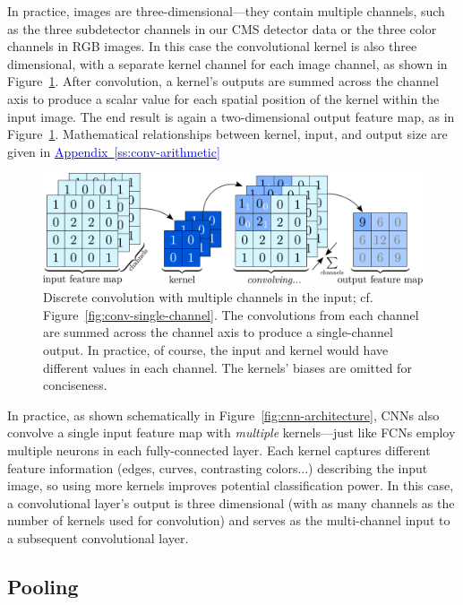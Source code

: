 \documentclass[11pt, a4paper]{article}
\newcommand{\myhref}[2]{\hyperref[#1]{\textcolor{blue}{#2}}}
\begin{document}
In practice, images are three-dimensional---they contain multiple channels, such as the three subdetector channels in our CMS detector data or the three color channels in RGB images.
In this case the convolutional kernel is also three dimensional, with a separate kernel channel for each image channel, as shown in Figure~\ref{fig:conv-multi-channel}.
After convolution, a kernel's outputs are summed across the channel axis to produce a scalar value for each spatial position of the kernel within the input image.
The end result is again a two-dimensional output feature map, as in Figure~\ref{fig:conv-multi-channel}.
Mathematical relationships between kernel, input, and output size are given in \myhref{ss:conv-arithmetic}{Appendix~\ref{ss:conv-arithmetic}}

\begin{figure}[htb!]
    \centering
    \includegraphics[width=0.9\linewidth]{vector/conv-multi-channel.pdf}
    \caption{Discrete convolution with multiple channels in the input; cf. Figure~\ref{fig:conv-single-channel}.
    The convolutions from each channel are summed across the channel axis to produce a single-channel output.
    In practice, of course, the input and kernel would have different values in each channel.
    The kernels' biases are omitted for conciseness.}
    \label{fig:conv-multi-channel}
\end{figure}

In practice, as shown schematically in Figure~\ref{fig:cnn-architecture}, CNNs also convolve a single input feature map with \textit{multiple} kernels---just like FCNs employ multiple neurons in each fully-connected layer.
Each kernel captures different feature information (edges, curves, contrasting colors...) describing the input image, so using more kernels improves potential classification power.
In this case, a convolutional layer's output is three dimensional (with as many channels as the number of kernels used for convolution) and serves as the multi-channel input to a subsequent convolutional layer.

\subsection{Pooling}
\end{document}
